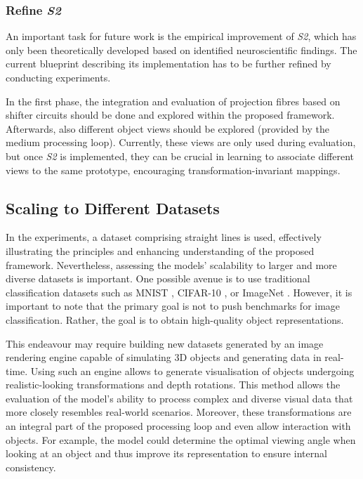 \subsubsection{Refine \emph{S2}}
An important task for future work is the empirical improvement of \emph{S2}, which has only been theoretically developed based on identified neuroscientific findings. The current blueprint describing its implementation has to be further refined by conducting experiments.

In the first phase, the integration and evaluation of projection fibres based on shifter circuits \cite{anderson_shifter_1987, olshausen_neurobiological_1993} should be done and explored within the proposed framework.
Afterwards, also different object views should be explored (provided by the medium processing loop). Currently, these views are only used during evaluation, but once \emph{S2} is implemented, they can be crucial in learning to associate different views to the same prototype, encouraging transformation-invariant mappings.


\subsection{Scaling to Different Datasets}
In the experiments, a dataset comprising straight lines is used, effectively illustrating the principles and enhancing understanding of the proposed framework.
Nevertheless, assessing the models' scalability to larger and more diverse datasets is important.
One possible avenue is to use traditional classification datasets such as MNIST , CIFAR-10 , or ImageNet .
However, it is important to note that the primary goal is not to push benchmarks for image classification.
Rather, the goal is to obtain high-quality object representations.

This endeavour may require building new datasets generated by an image rendering engine capable of simulating 3D objects and generating data in real-time.
Using such an engine allows to generate visualisation of objects undergoing realistic-looking transformations and depth rotations.
This method allows the evaluation of the model's ability to process complex and diverse visual data that more closely resembles real-world scenarios.
Moreover, these transformations are an integral part of the proposed processing loop and even allow interaction with objects. For example, the model could determine the optimal viewing angle when looking at an object and thus improve its representation to ensure internal consistency.



